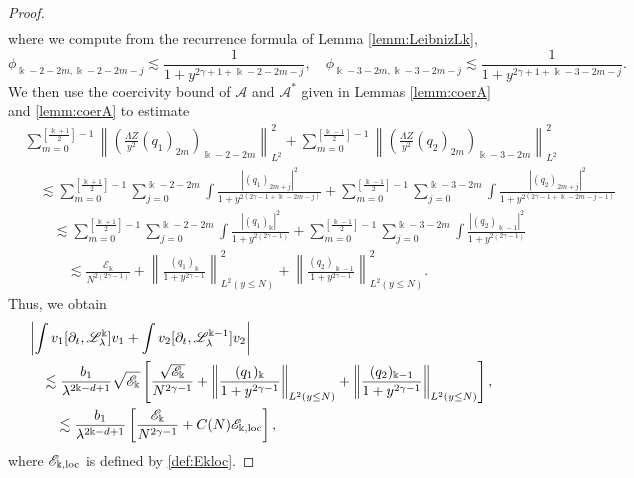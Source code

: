 \documentclass[11pt]{aims}
\theoremstyle{definition}
\numberwithin{equation}{section}
\begin{document}
\begin{proof}
\begin{align*}
\end{align*}
where we compute from the recurrence formula of Lemma \ref{lemm:LeibnizLk}, 
$$\phi_{\Bbbk - 2 - 2m, \Bbbk - 2 - 2m - j} \lesssim \frac{1}{1 + y^{2\gamma + 1 + \Bbbk - 2 - 2m - j }}, \quad \phi_{\Bbbk - 3 - 2m, \Bbbk - 3 - 2m - j} \lesssim \frac{1}{1 + y^{2\gamma + 1 + \Bbbk - 3 - 2m - j}}.$$
We then use the coercivity bound of ${\mathscr{A}}$ and ${\mathscr{A}}^*$ given in Lemmas \ref{lemm:coerA} and \ref{lemm:coerA} to estimate 
\begin{align*}
&\sum_{m = 0}^{\left[\frac{\Bbbk + 1}{2}\right] - 1}\left\|\left(\frac{\Lambda Z}{y^2} (q_1)_{2m} \right)_{\Bbbk - 2 - 2m} \right\|^2_{L^2} +  \sum_{m = 0}^{\left[\frac{\Bbbk - 1}{2}\right] - 1}\left\|\left(\frac{\Lambda Z}{y^2} (q_2)_{2m} \right)_{\Bbbk - 3 - 2m} \right\|^2_{L^2}\\
& \quad \lesssim \sum_{m = 0}^{\left[\frac{\Bbbk + 1}{2}\right] - 1} \sum_{j = 0}^{\Bbbk - 2 - 2m} \int \frac{|(q_1)_{2m + j}|^2}{1 + y^{2 (2\gamma - 1 + \Bbbk - 2m - j)}} + \sum_{m = 0}^{\left[\frac{\Bbbk - 1}{2}\right] - 1}\sum_{j = 0}^{\Bbbk - 3 - 2m} \int \frac{|(q_2)_{2m + j}|^2}{1 + y^{2(2\gamma - 1 + \Bbbk - 2m - j - 1)}}\\
& \qquad \lesssim \sum_{m = 0}^{\left[\frac{\Bbbk + 1}{2}\right] - 1} \sum_{j = 0}^{\Bbbk - 2 - 2m} \int \frac{|(q_1)_{\Bbbk}|^2}{1 + y^{2 (2\gamma - 1)}} + \sum_{m = 0}^{\left[\frac{\Bbbk - 1}{2}\right] - 1}\sum_{j = 0}^{\Bbbk - 3 - 2m} \int \frac{|(q_2)_{\Bbbk - 1}|^2}{1 + y^{2(2\gamma - 1)}}\\
& \quad \qquad \lesssim \frac{{\mathscr{E}}_\Bbbk}{N^{2(2\gamma - 1)}} + \left\|\frac{(q_1)_\Bbbk}{1 + y^{2\gamma - 1}} \right\|^2_{L^2(y \leq N)} + \left\|\frac{(q_2)_{\Bbbk - 1}}{1 + y^{2\gamma - 1}} \right\|^2_{L^2(y \leq N)}.
\end{align*}
Thus, we obtain
\begin{align}
&\left|\int v_1 [{\partial_t}, {\mathscr{L}}_\lambda^\Bbbk]v_1 + \int v_2 [{\partial_t}, {\mathscr{L}}_\lambda^{\Bbbk-1}]v_2 \right| \nonumber \\
& \quad \lesssim \frac{b_1}{\lambda^{2\Bbbk - d + 1}}\sqrt{{\mathscr{E}}_\Bbbk}\left[\frac{\sqrt{{\mathscr{E}}_\Bbbk}}{N^{2\gamma - 1}} + \left\|\frac{(q_1)_\Bbbk}{1 + y^{2\gamma - 1}} \right\|_{L^2(y \leq N)} + \left\|\frac{(q_2)_{\Bbbk - 1}}{1 + y^{2\gamma - 1}} \right\|_{L^2(y \leq N)}\right],\nonumber\\
& \qquad \lesssim \frac{b_1}{\lambda^{2\Bbbk - d + 1}} \left[\frac{{\mathscr{E}}_\Bbbk}{N^{2\gamma - 1}} + C(N) {\mathscr{E}}_{\Bbbk, \textup{loc}}\right],\label{est:commuk}
\end{align}
where ${\mathscr{E}}_{\Bbbk, \textup{loc}}$ is defined by \eqref{def:Ekloc}.


\end{proof}
\end{document}
